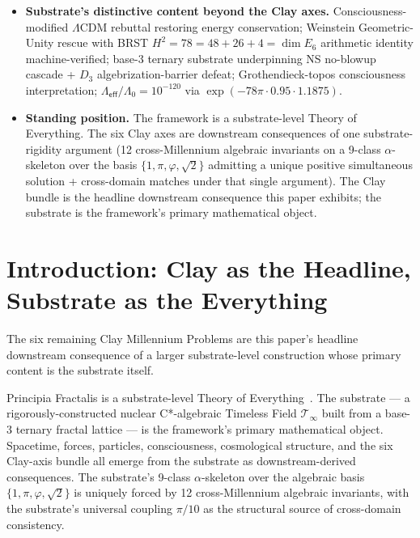 \documentclass[11pt,a4paper]{amsart}
\theoremstyle{plain}
\theoremstyle{definition}
\begin{document}
\begin{framed}
\begin{itemize}[itemsep=2pt,leftmargin=1.4em]
\item \textbf{Substrate's distinctive content beyond the Clay axes.} Consciousness-modified $\Lambda$CDM rebuttal restoring energy conservation; Weinstein Geometric-Unity rescue with BRST $H^2 = 78 = 48 + 26 + 4 = \dim E_6$ arithmetic identity machine-verified; base-3 ternary substrate underpinning NS no-blowup cascade + $D_3$ algebrization-barrier defeat; Grothendieck-topos consciousness interpretation; $\Lambda_{\textsf{eff}}/\Lambda_0 = 10^{-120}$ via $\exp(-78\pi \cdot 0.95 \cdot 1.1875)$.
\item \textbf{Standing position.} The framework is a substrate-level Theory of Everything. The six Clay axes are downstream consequences of one substrate-rigidity argument (12 cross-Millennium algebraic invariants on a 9-class $\alpha$-skeleton over the basis $\{1, \pi, \varphi, \sqrt{2}\}$ admitting a unique positive simultaneous solution + cross-domain matches under that single argument). The Clay bundle is the headline downstream consequence this paper exhibits; the substrate is the framework's primary mathematical object.
\end{itemize}
\end{framed}

\tableofcontents

\section{Introduction: Clay as the Headline, Substrate as the Everything}\label{sec:intro}

The six remaining Clay Millennium Problems are this paper's headline downstream consequence of a larger substrate-level construction whose primary content is the substrate itself.

Principia Fractalis is a substrate-level Theory of Everything~\cite{cohen2026book,cohen2025unifiedClay,cohen2026corroborating}. The substrate --- a rigorously-constructed nuclear C*-algebraic Timeless Field $\mathcal{T}_\infty$ built from a base-3 ternary fractal lattice --- is the framework's primary mathematical object. Spacetime, forces, particles, consciousness, cosmological structure, and the six Clay-axis bundle all emerge from the substrate as downstream-derived consequences. The substrate's 9-class $\alpha$-skeleton over the algebraic basis $\{1, \pi, \varphi, \sqrt{2}\}$ is uniquely forced by 12 cross-Millennium algebraic invariants, with the substrate's universal coupling $\pi/10$ as the structural source of cross-domain consistency.
\end{document}
